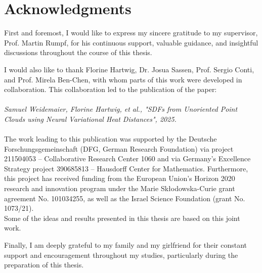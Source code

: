 \documentclass[12pt,openany]{book}
\theoremstyle{plainnormal}
\theoremstyle{remark}
\begin{document}
\section*{Acknowledgments}
\endgroup
First and foremost, I would like to express my sincere gratitude to my supervisor, Prof. Martin Rumpf, for his continuous support, valuable guidance, and insightful discussions throughout the course of this thesis.
\par
I would also like to thank Florine Hartwig, Dr. Josua Sassen, Prof. Sergio Conti, and Prof. Mirela Ben-Chen, with whom parts of this work were developed in collaboration. This collaboration led to the publication of the paper:\\
\hspace{0.5em}\\
\textit{Samuel Weidemaier, Florine Hartwig, et al., "SDFs from Unoriented Point Clouds using Neural Variational
Heat Distances", 2025.}\\
\hspace{0.5em}
\\
The work leading to this publication was supported by the Deutsche Forschungsgemeinschaft (DFG, German Research Foundation) via project 211504053 -- Collaborative Research Center 1060 and via Germany’s Excellence Strategy project 390685813 -- Hausdorff Center for Mathematics.
Furthermore, this project has received funding from the European Union’s Horizon 2020 research and innovation program under the Marie Skłodowska-Curie grant agreement No. 101034255, as well as the Israel Science Foundation (grant No. 1073/21).\\
Some of the ideas and results presented in this thesis are based on this joint work.\par 
\noindent
Finally, I am deeply grateful to my family and my girlfriend for their constant support and encouragement throughout my studies, particularly during the preparation of this thesis.
\clearpage

\tableofcontents
\end{document}
